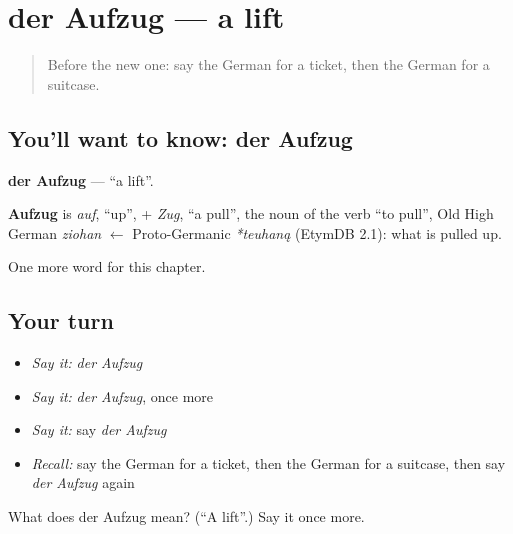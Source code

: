 \section[der Aufzug]{der Aufzug — a lift}

\label{lesson:GE-C111-aufzug}



\begin{quote}
Before the new one: say the German for a ticket, then the German for a suitcase.
\end{quote}

\subsection*{You'll want to know: der Aufzug}
\textbf{der Aufzug} — \textquotedblleft{}a lift\textquotedblright{}.

\begin{cousinweb}
\textbf{Aufzug} is \emph{auf}, \textquotedblleft{}up\textquotedblright{}, + \emph{Zug}, \textquotedblleft{}a pull\textquotedblright{}, the noun of the verb \textquotedblleft{}to pull\textquotedblright{}, Old High German \emph{ziohan} $\leftarrow$ Proto-Germanic \emph{*teuhaną} (EtymDB 2.1): what is pulled up.
\end{cousinweb}

\begin{grammarlens}[title={What you've built}]
One more word for this chapter.
\end{grammarlens}

\subsection*{Your turn}
\begin{itemize}
\raggedright
  \item \emph{Say it:} \emph{der Aufzug}
  \item \emph{Say it:} \emph{der Aufzug}, once more
  \item \emph{Say it:} say \emph{der Aufzug}
  \item \emph{Recall:} say the German for a ticket, then the German for a suitcase, then say \emph{der Aufzug} again
\end{itemize}

\begin{tcolorbox}[breakable,colback=teal!4,colframe=teal!35!black,title={Before you move on}]
What does der Aufzug mean? (\textquotedblleft{}A lift\textquotedblright{}.) Say it once more.
\end{tcolorbox}
